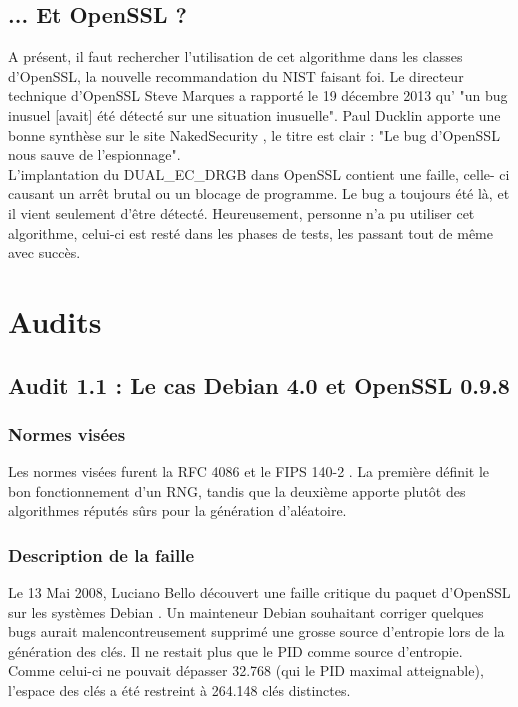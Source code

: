 	\subsection{... Et OpenSSL ?}
	
	A présent, il faut rechercher l'utilisation de cet algorithme dans les classes d'OpenSSL, la nouvelle recommandation du NIST faisant foi. Le directeur technique d'OpenSSL Steve Marques a rapporté le 19 décembre 2013 qu' "un bug inusuel [avait] été détecté sur une situation inusuelle". Paul Ducklin apporte une bonne synthèse sur le site NakedSecurity \cite{duckin2013openssl}, le titre est clair : "Le bug d'OpenSSL nous sauve de l'espionnage".\\
	
	
	L'implantation du DUAL\_EC\_DRGB dans OpenSSL contient une faille, celle- ci causant un arrêt brutal ou un blocage de programme. Le bug a toujours été là, et il vient seulement d'être détecté.	 Heureusement, personne n'a pu utiliser cet algorithme, celui-ci est resté dans les phases de tests, les passant tout de même avec succès.\\

\section{Audits}
	\subsection{Audit 1.1 : Le cas Debian 4.0 et OpenSSL 0.9.8}
		\subsubsection{Normes visées}
			Les normes visées furent la RFC 4086 \cite{rfc4086} et le FIPS 140-2 \cite{fips140-2}. La première définit le bon fonctionnement d'un RNG, tandis que la deuxième apporte plutôt des algorithmes réputés sûrs pour la génération d'aléatoire.
		
		\subsubsection{Description de la faille}
			Le 13 Mai 2008, Luciano Bello découvert une faille critique du paquet d'OpenSSL sur les systèmes Debian \cite{faille2008linux.org}. Un mainteneur Debian souhaitant corriger quelques bugs aurait malencontreusement supprimé une grosse source d'entropie lors de la génération des clés. Il ne restait plus que le PID comme source d'entropie. Comme celui-ci ne pouvait dépasser 32.768 (qui le PID maximal atteignable), l'espace des clés a été restreint à 264.148 clés distinctes.\\
		
